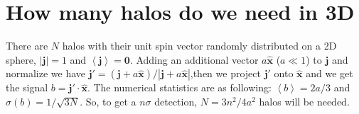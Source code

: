 \documentclass[aps,prd,twocolumn,amsmath,amssymb,amsfont,superscriptaddress]{revtex4-1}
\newcommand{\bs}{\boldsymbol}
\begin{document}
\appendix
\section{How many halos do we need in 3D}
There are $N$ halos with their unit spin vector randomly distributed on a 2D sphere, $|\bs{j}|=1$ and $\left\langle \bs{j} \right\rangle =\bs{0}$. Adding an additional vector $a\hat{\bs{x}}$ ($a\ll 1$) to $\bs{j}$ and normalize we have $\bs{j}'=(\bs{j}+a\hat{\bs{x}})/|\bs{j}+a\hat{\bs{x}}|$,then we project $\bs{j}'$ onto $\hat{\bs{x}}$ and we get the signal $b=\bs{j}'\cdot\hat{\bs{x}}$. The numerical statistics are as following: $\left\langle b \right\rangle=2a/3$ and $\sigma(b)=1/\sqrt{3N}$. So, to get a $n\sigma$ detection, $N=3n^2/4a^2$ halos will be needed.



\end{document}

